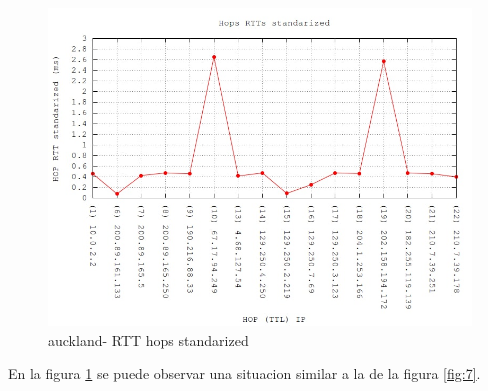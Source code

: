 \begin{figure}[!htbp]
  \centering
    \includegraphics[scale=0.6]{imagenes/auckland-graficos/traceroute-auckland-standarized.jpg}
  \caption{auckland- RTT hops standarized}
  \label{fig:8}
\end{figure}

En la figura \ref{fig:8} se puede observar una situacion similar a la de la figura \ref{fig:7}.


